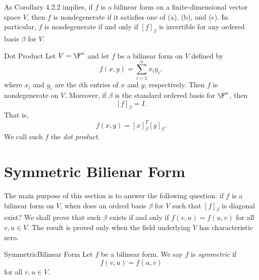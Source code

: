 \documentclass[math_245.tex]{subfiles}
\begin{document}
    \begin{remark}
        As Corollary 4.2.2 implies, if $f$ is a bilinear form on a finite-dimensional vector space $V$, then $f$ is nondegenerate if it satisfies one of (a), (b), and (c). In particular, $f$ is nondegenerate if and only if $\left[ f \right] _\beta$ is invertible for any ordered basis $\beta$ for $V$.
    \end{remark}

    \begin{definition}{Dot Product}{}
        Let $V = \F^n$ and let $f$ be a bilinear form on $V$ defined by
        \begin{equation*}
            f\left( x,y \right) = \sum^{n}_{i=1} x_iy_i,
        \end{equation*}
        where $x_i$ and $y_i$ are the $i$th entries of $x$ and $y$, respectively. Then $f$ is nondegenerate on $V$. Moreover, if $\beta$ is the standard ordered basis for $\F^n$, then
        \begin{equation*}
            \left[ f \right] _\beta = I.
        \end{equation*}
        That is,
        \begin{equation*}
            f\left( x,y \right) = \left[ x \right] _\beta^T \left[ y \right] _\beta.
        \end{equation*}
        We call such $f$ the \emph{dot product}.
    \end{definition}

    \section{Symmetric Bilienar Form}
    
    \begin{remark}
        The main purpose of this section is to answer the following question: if $f$ is a bilinear form on $V$, when does an ordred basis $\beta$ for $V$ such that $[f]_\beta$ is diagonal exist? We shall prove that such $\beta$ exists if and only if $f\left( v,u \right) = f\left( u,v \right)$ for all $v,u\in V$.  The result is proved only when the field underlying $V$ has characteristic zero.
    \end{remark}

    \begin{definition}{Symmetric}{Bilinear Form}
        Let $f$ be a bilinear form. We say $f$ is \emph{symmetric} if
        \begin{equation*}
            f\left( v,u \right) = f\left( u,v \right) 
        \end{equation*}
        for all $v,u\in V$.
    \end{definition}
\end{document}
